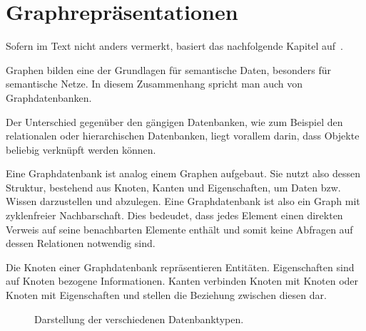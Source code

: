 \chapter{Graphrepräsentationen}
\label{chap:graph_data}

Sofern im Text nicht anders vermerkt, basiert das nachfolgende Kapitel auf~\cite{linkeddatatools}.

Graphen bilden eine der Grundlagen für semantische Daten, besonders für semantische Netze. In diesem Zusammenhang spricht man auch von Graphdatenbanken.

Der Unterschied gegenüber den gängigen Datenbanken, wie zum Beispiel den relationalen oder hierarchischen Datenbanken, liegt vorallem darin, dass Objekte beliebig verknüpft werden können.

Eine Graphdatenbank ist analog einem Graphen aufgebaut. Sie nutzt also dessen Struktur, bestehend aus Knoten, Kanten und Eigenschaften, um Daten bzw. Wissen darzustellen und abzulegen. Eine Graphdatenbank ist also ein Graph mit zyklenfreier Nachbarschaft. Dies bedeudet, dass jedes Element einen direkten Verweis auf seine benachbarten Elemente enthält und somit keine Abfragen auf dessen Relationen notwendig sind.

Die Knoten einer Graphdatenbank repräsentieren Entitäten. Eigenschaften sind auf Knoten bezogene Informationen. Kanten verbinden Knoten mit Knoten oder Knoten mit Eigenschaften und stellen die Beziehung zwischen diesen dar.

\begin{figure}[htbp]
\centering {}
\caption{Darstellung der verschiedenen Datenbanktypen.\label{fig:datenbanktypen}\protect\footnotemark}
\end{figure}

